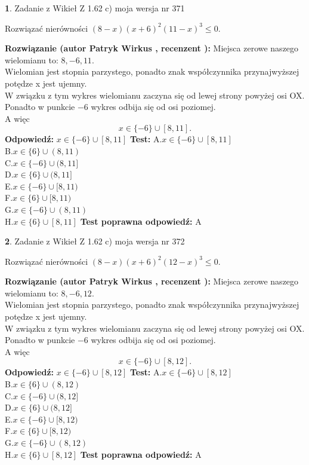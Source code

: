\documentclass[12pt, a4paper]{article}
\theoremstyle{definition} %
\newtheorem{zad}{}
\newcommand{\zadStart}[1]{\begin{zad}#1\newline}
\newcommand{\zadStop}{\end{zad}}
\newcommand{\rozwStart}[2]{\noindent \textbf{Rozwiązanie (autor #1 , recenzent #2): }\newline}
\newcommand{\rozwStop}{\newline}
\newcommand{\odpStart}{\noindent \textbf{Odpowiedź:}\newline}
\newcommand{\odpStop}{\newline}
\newcommand{\testStart}{\noindent \textbf{Test:}\newline}
\newcommand{\testStop}{\newline}
\newcommand{\kluczStart}{\noindent \textbf{Test poprawna odpowiedź:}\newline}
\newcommand{\kluczStop}{\newline}
\begin{document}
\zadStart{Zadanie z Wikieł Z 1.62 c) moja wersja nr 371}

Rozwiązać nierówności $(8-x)(x+6)^{2}(11-x)^{3}\le0$.
\zadStop
\rozwStart{Patryk Wirkus}{}
Miejsca zerowe naszego wielomianu to: $8, -6, 11$.\\
Wielomian jest stopnia parzystego, ponadto znak współczynnika przy\linebreak najwyższej potędze x jest ujemny.\\ W związku z tym wykres wielomianu zaczyna się od lewej strony powyżej osi OX.\\
Ponadto w punkcie $-6$ wykres odbija się od osi poziomej.\\
A więc $$x \in \{-6\} \cup [8,11].$$
\rozwStop
\odpStart
$x \in \{-6\} \cup [8,11]$
\odpStop
\testStart
A.$x \in \{-6\} \cup [8,11]$\\
B.$x \in \{6\} \cup (8,11)$\\
C.$x \in \{-6\} \cup (8,11]$\\
D.$x \in \{6\} \cup (8,11]$\\
E.$x \in \{-6\} \cup [8,11)$\\
F.$x \in \{6\} \cup [8,11)$\\
G.$x \in \{-6\} \cup (8,11)$\\
H.$x \in \{6\} \cup [8,11]$
\testStop
\kluczStart
A
\kluczStop



\zadStart{Zadanie z Wikieł Z 1.62 c) moja wersja nr 372}

Rozwiązać nierówności $(8-x)(x+6)^{2}(12-x)^{3}\le0$.
\zadStop
\rozwStart{Patryk Wirkus}{}
Miejsca zerowe naszego wielomianu to: $8, -6, 12$.\\
Wielomian jest stopnia parzystego, ponadto znak współczynnika przy\linebreak najwyższej potędze x jest ujemny.\\ W związku z tym wykres wielomianu zaczyna się od lewej strony powyżej osi OX.\\
Ponadto w punkcie $-6$ wykres odbija się od osi poziomej.\\
A więc $$x \in \{-6\} \cup [8,12].$$
\rozwStop
\odpStart
$x \in \{-6\} \cup [8,12]$
\odpStop
\testStart
A.$x \in \{-6\} \cup [8,12]$\\
B.$x \in \{6\} \cup (8,12)$\\
C.$x \in \{-6\} \cup (8,12]$\\
D.$x \in \{6\} \cup (8,12]$\\
E.$x \in \{-6\} \cup [8,12)$\\
F.$x \in \{6\} \cup [8,12)$\\
G.$x \in \{-6\} \cup (8,12)$\\
H.$x \in \{6\} \cup [8,12]$
\testStop
\kluczStart
A
\kluczStop
\end{document}
